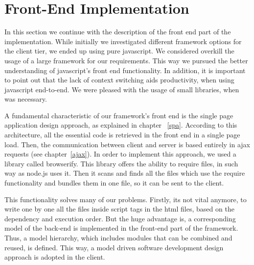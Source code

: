 \section{Front-End Implementation}
In this section we continue with the description of the front end part of the implementation. While initially we investigated different framework options for the client tier, we ended up using pure javascript. We considered overkill the usage of a large framework for our requirements. This way we pursued the better understanding of javascript's front end functionality. In addition, it is important to point out that the lack of context switching aids productivity, when using javascript end-to-end. We were pleased with the usage of small libraries, when was necessary. \par 
	A fundamental characteristic of our framework's front end is the single page application design approach, as explained in chapter ~\ref{spa}. According to this architecture, all the essential code is retrieved in the front end in a single page load. Then, the communication between client and server is based entirely in ajax requests (see chapter~\ref{ajax}). In order to implement this approach, we used a library called browserify. This library offers the ability to require files, in such way as node.js uses it. Then it scans and finds all the files which use the require functionality and bundles them in one file, so it can be sent to the client. \par
	This functionality solves many of our problems. Firstly, its not vital anymore, to write one by one all the files inside script tags in the html files, based on the dependency and execution order. But the huge advantage is, a corresponding model of the back-end is implemented in the front-end part of the framework. Thus, a model hierarchy, which includes modules that can be combined and reused, is defined. This way, a model driven software development design approach is adopted in the client.

